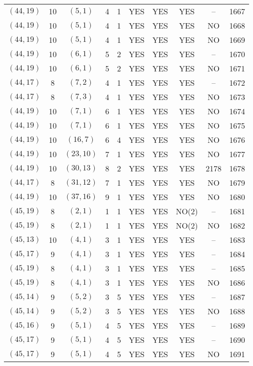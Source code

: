 \begin{longtable}{|c|c|c|c|c|c|c|c|c|c|}
$(44, 19)$ & 10 & $(5, 1)$ & 4 & 1 & YES & YES & YES & -- & 1667\\
$(44, 19)$ & 10 & $(5, 1)$ & 4 & 1 & YES & YES & YES & NO & 1668\\
$(44, 19)$ & 10 & $(5, 1)$ & 4 & 1 & YES & YES & YES & NO & 1669\\
$(44, 19)$ & 10 & $(6, 1)$ & 5 & 2 & YES & YES & YES & -- & 1670\\
$(44, 19)$ & 10 & $(6, 1)$ & 5 & 2 & YES & YES & YES & NO & 1671\\
$(44, 17)$ & 8 & $(7, 2)$ & 4 & 1 & YES & YES & YES & -- & 1672\\
$(44, 17)$ & 8 & $(7, 3)$ & 4 & 1 & YES & YES & YES & NO & 1673\\
$(44, 19)$ & 10 & $(7, 1)$ & 6 & 1 & YES & YES & YES & NO & 1674\\
$(44, 19)$ & 10 & $(7, 1)$ & 6 & 1 & YES & YES & YES & NO & 1675\\
$(44, 19)$ & 10 & $(16, 7)$ & 6 & 4 & YES & YES & YES & NO & 1676\\
$(44, 19)$ & 10 & $(23, 10)$ & 7 & 1 & YES & YES & YES & NO & 1677\\
$(44, 19)$ & 10 & $(30, 13)$ & 8 & 2 & YES & YES & YES & 2178 & 1678\\
$(44, 17)$ & 8 & $(31, 12)$ & 7 & 1 & YES & YES & YES & NO & 1679\\
$(44, 19)$ & 10 & $(37, 16)$ & 9 & 1 & YES & YES & YES & NO & 1680\\
$(45, 19)$ & 8 & $(2, 1)$ & 1 & 1 & YES & YES & NO(2) & -- & 1681\\
$(45, 19)$ & 8 & $(2, 1)$ & 1 & 1 & YES & YES & NO(2) & NO & 1682\\
$(45, 13)$ & 10 & $(4, 1)$ & 3 & 1 & YES & YES & YES & -- & 1683\\
$(45, 17)$ & 9 & $(4, 1)$ & 3 & 1 & YES & YES & YES & -- & 1684\\
$(45, 19)$ & 8 & $(4, 1)$ & 3 & 1 & YES & YES & YES & -- & 1685\\
$(45, 19)$ & 8 & $(4, 1)$ & 3 & 1 & YES & YES & YES & NO & 1686\\
$(45, 14)$ & 9 & $(5, 2)$ & 3 & 5 & YES & YES & YES & -- & 1687\\
$(45, 14)$ & 9 & $(5, 2)$ & 3 & 5 & YES & YES & YES & NO & 1688\\
$(45, 16)$ & 9 & $(5, 1)$ & 4 & 5 & YES & YES & YES & -- & 1689\\
$(45, 17)$ & 9 & $(5, 1)$ & 4 & 5 & YES & YES & YES & -- & 1690\\
$(45, 17)$ & 9 & $(5, 1)$ & 4 & 5 & YES & YES & YES & NO & 1691\\

\end{longtable}

